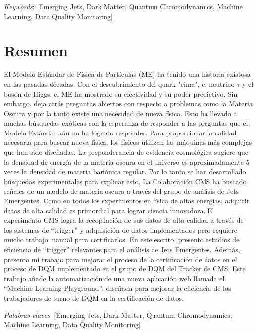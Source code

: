 \vspace*{1cm}

\textit{Keywords}:  [Emerging Jets, Dark Matter, Quantum Chromodynamics, Machine Learning, Data Quality Monitoring]


\chapter*{Resumen}

El Modelo Estándar de Física de Partículas (ME) ha tenido una historia existosa en las pasadas décadas. Con el descubrimiento del quark "cima", el neutrino $\tau$ y el bosón de Higgs, el ME ha mostrado su efectividad y su poder predictivo. Sin embargo, deja atrás preguntas abiertos con respecto a problemas como la Materia Oscura y por la tanto existe una necesidad de nueva física. Esto ha llevado a muchas búsquedas exóticas con la esperanza de responder a las preguntas que el Modelo Estándar aún no ha logrado responder. Para proporcionar la calidad necesaria para buscar nueva física, los físicos utilizan las máquinas más complejas que han sido diseñadas. La preponderancia de evidencia cosmológica sugiere que la densidad de energía de la materia oscura en el universo es aproximadamente 5 veces la densidad de materia bariónica regular. Por lo tanto se han desarrollado búsquedas experimentales para explicar esto. La Colaboración CMS ha buscado señales de un modelo de materia oscura a través del grupo de análisis de Jets Emergentes. Como en todos los experimentos en física de altas energías, adquirir datos de alta calidad es primordial para lograr ciencia innovadora.
El experimento CMS logra la recopilación de sus datos de alta calidad a través de los sistemas de ``trigger'' y adquisición de datos implementados pero requiere mucho trabajo manual para certificarlos. En este escrito, presento estudios de eficiencia de ``trigger'' relevantes para el análisis de Jets Emergentes. Además, presento mi trabajo para mejorar el proceso de la certificación de datos en el proceso de DQM implementado en el grupo de DQM del Tracker de CMS. Este trabajo añade la automatización de una nueva aplicación web llamada el ``Machine Learning Playground'', diseñada para mejorar la eficiencia de los trabajadores de turno de DQM en la certificación de datos.



\textit{Palabras claves}:  [Emerging Jets, Dark Matter, Quantum Chromodynamics, Machine Learning, Data Quality Monitoring]
